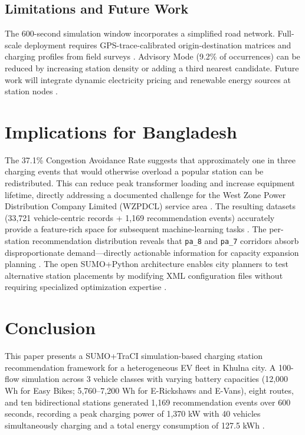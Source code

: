 \documentclass[conference]{IEEEtran}
\begin{document}
\subsection{Limitations and Future Work}

The 600-second simulation window incorporates a simplified road network. Full-scale deployment requires GPS-trace-calibrated origin-destination matrices and charging profiles from field surveys \cite{b4}. Advisory Mode (9.2\% of occurrences) can be reduced by increasing station density or adding a third nearest candidate. Future work will integrate dynamic electricity pricing and renewable energy sources at station nodes \cite{b16}.

\section{Implications for Bangladesh}

The 37.1\% Congestion Avoidance Rate suggests that approximately one in three charging events that would otherwise overload a popular station can be redistributed. This can reduce peak transformer loading and increase equipment lifetime, directly addressing a documented challenge for the West Zone Power Distribution Company Limited (WZPDCL) service area \cite{b14, b21}. The resulting datasets (33,721 vehicle-centric records + 1,169 recommendation events) accurately provide a feature-rich space for subsequent machine-learning tasks \cite{b8}. The per-station recommendation distribution reveals that \texttt{pa\_8} and \texttt{pa\_7} corridors absorb disproportionate demand---directly actionable information for capacity expansion planning \cite{b13}. The open SUMO+Python architecture enables city planners to test alternative station placements by modifying XML configuration files without requiring specialized optimization expertise \cite{b10}.

\section{Conclusion}

This paper presents a SUMO+TraCI simulation-based charging station recommendation framework for a heterogeneous EV fleet in Khulna city. A 100-flow simulation across 3 vehicle classes with varying battery capacities (12,000 Wh for Easy Bikes; 5,760--7,200 Wh for E-Rickshaws and E-Vans), eight routes, and ten bidirectional stations generated 1,169 recommendation events over 600 seconds, recording a peak charging power of 1,370 kW with 40 vehicles simultaneously charging and a total energy consumption of 127.5 kWh \cite{b10, b11}.
\end{document}
